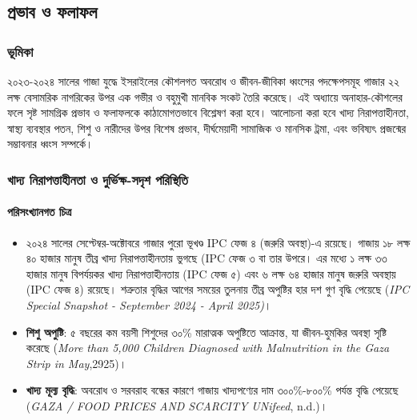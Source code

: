 \subsection{\texorpdfstring{প্রভাব ও ফলাফল}{৪র্থ অধ্যায়: প্রভাব ও ফলাফল}}\label{ux9a5ux9b0-ux985ux9a7ux9afux9df-ux9aaux9b0ux9adux9ac-ux993-ux9abux9b2ux9abux9b2}

\subsubsection{ভূমিকা}\label{ux9adux9aeux995-2}

২০২৩-২০২৪ সালের গাজা যুদ্ধে ইসরাইলের কৌশলগত অবরোধ ও জীবন-জীবিকা ধ্বংসের
পদক্ষেপসমূহ গাজার ২২ লক্ষ বেসামরিক নাগরিকের উপর এক গভীর ও বহুমুখী মানবিক সংকট
তৈরি করেছে। এই অধ্যায়ে অনাহার-কৌশলের ফলে সৃষ্ট সামগ্রিক প্রভাব ও ফলাফলকে
কাঠামোগতভাবে বিশ্লেষণ করা হবে। আলোচনা করা হবে খাদ্য নিরাপত্তাহীনতা, স্বাস্থ্য
ব্যবস্থার পতন, শিশু ও নারীদের উপর বিশেষ প্রভাব, দীর্ঘমেয়াদী সামাজিক ও মানসিক
ট্রমা, এবং ভবিষ্যৎ প্রজন্মের সম্ভাবনার ধ্বংস সম্পর্কে।

\subsubsection{\texorpdfstring{খাদ্য নিরাপত্তাহীনতা ও দুর্ভিক্ষ-সদৃশ পরিস্থিতি
}{খাদ্য নিরাপত্তাহীনতা ও দুর্ভিক্ষ-সদৃশ পরিস্থিতি }}\label{ux996ux9a6ux9af-ux9a8ux9b0ux9aaux9a4ux9a4ux9b9ux9a8ux9a4-ux993-ux9a6ux9b0ux9adux995ux9b7-ux9b8ux9a6ux9b6-ux9aaux9b0ux9b8ux9a5ux9a4}

\paragraph{\texorpdfstring{পরিসংখ্যানগত চিত্র
}{পরিসংখ্যানগত চিত্র }}\label{ux9aaux9b0ux9b8ux996ux9afux9a8ux997ux9a4-ux99aux9a4ux9b0}

\begin{itemize}
\item
  ২০২৪ সালের সেপ্টেম্বর-অক্টোবরে গাজার পুরো ভূখণ্ড IPC ফেজ ৪ (জরুরি অবস্থা)-এ
  রয়েছে। গাজায় ১৮ লক্ষ ৪০ হাজার মানুষ তীব্র খাদ্য নিরাপত্তাহীনতায় ভুগছে (IPC
  ফেজ ৩ বা তার উপরে। এর মধ্যে ১ লক্ষ ৩৩ হাজার মানুষ বিপর্যয়কর খাদ্য
  নিরাপত্তাহীনতায় (IPC ফেজ ৫) এবং ৬ লক্ষ ৬৪ হাজার মানুষ জরুরি অবস্থায় (IPC
  ফেজ ৪) রয়েছে। শত্রুতার বৃদ্ধির আগের সময়ের তুলনায় তীব্র অপুষ্টির হার দশ গুণ বৃদ্ধি
  পেয়েছে (\emph{IPC Special Snapshot - September 2024 - April 2025)}।
\item
  \textbf{শিশু অপুষ্টি}: ৫ বছরের কম বয়সী শিশুদের ৩০\% মারাত্মক অপুষ্টিতে
  আক্রান্ত, যা জীবন-হুমকির অবস্থা সৃষ্টি করেছে (\emph{More than 5,000 Children
  Diagnosed with Malnutrition in the Gaza Strip in May},2925)।
\item
  \textbf{খাদ্য মূল্য বৃদ্ধি}: অবরোধ ও সরবরাহ বন্ধের কারণে গাজায় খাদ্যপণ্যের দাম
  ৩০০\%-৮০০\% পর্যন্ত বৃদ্ধি পেয়েছে (\emph{GAZA / FOOD PRICES AND SCARCITY
  \textbar{} UNifeed}, n.d.)।
\end{itemize}

